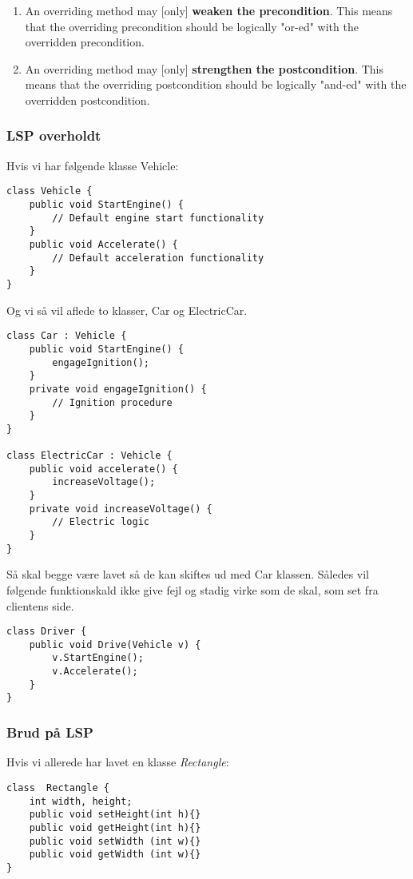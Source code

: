 \begin{enumerate}
	\item An overriding method may [only] \textbf{weaken the precondition}. This means
	that the overriding precondition should be logically "or-ed" with the
	overridden precondition.
	\item An overriding method may [only] \textbf{strengthen the postcondition}. This
	means that the overriding postcondition should be logically "and-ed" with
	the overridden postcondition.
\end{enumerate}

\subsubsection{LSP overholdt}
Hvis vi har følgende klasse Vehicle:

\begin{lstlisting}
class Vehicle {
	public void StartEngine() {
		// Default engine start functionality
	}
	public void Accelerate() {
		// Default acceleration functionality
	}
}
\end{lstlisting}

Og vi så vil aflede to klasser, Car og ElectricCar.

\begin{lstlisting}
class Car : Vehicle {
	public void StartEngine() {
		engageIgnition();
	}
	private void engageIgnition() {
		// Ignition procedure
	}
}

class ElectricCar : Vehicle {
	public void accelerate() {
		increaseVoltage();
	}
	private void increaseVoltage() {
		// Electric logic
	}
}
\end{lstlisting}

Så skal begge være lavet så de kan skiftes ud med Car klassen. Således vil følgende funktionskald ikke give fejl og stadig virke som de skal, som set fra clientens side.

\begin{lstlisting}
class Driver {
	public void Drive(Vehicle v) {
		v.StartEngine();
		v.Accelerate();
	}
}
\end{lstlisting}

\subsubsection{Brud på LSP}
Hvis vi allerede har lavet en klasse \textit{Rectangle}:

\begin{lstlisting}
class  Rectangle {
	int width, height;
	public void setHeight(int h){}
	public void getHeight(int h){}
	public void setWidth (int w){}
	public void getWidth (int w){}
}
\end{lstlisting}

